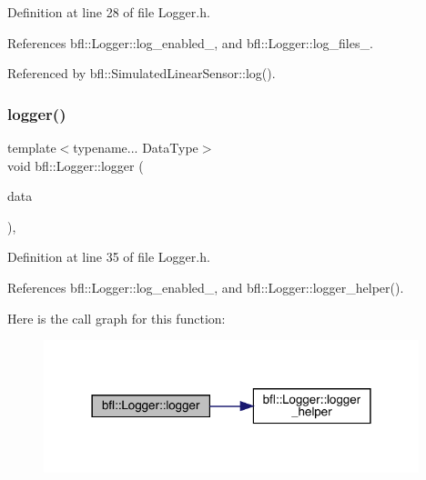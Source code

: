 Definition at line 28 of file Logger.\+h.



References bfl\+::\+Logger\+::log\+\_\+enabled\+\_\+, and bfl\+::\+Logger\+::log\+\_\+files\+\_\+.



Referenced by bfl\+::\+Simulated\+Linear\+Sensor\+::log().

\mbox{\label{classbfl_1_1Logger_aca2086c9256e5c404872b91f7f25b97d}} 
\subsubsection{\texorpdfstring{logger()}{logger()}\hspace{0.1cm}{\footnotesize\ttfamily [2/4]}}
{\footnotesize\ttfamily template$<$typename... Data\+Type$>$ \\
void bfl\+::\+Logger\+::logger (\begin{DoxyParamCaption}\item[{Data\+Type...}]{data }\end{DoxyParamCaption})\hspace{0.3cm}{\ttfamily [inline]}, {\ttfamily [inherited]}}



Definition at line 35 of file Logger.\+h.



References bfl\+::\+Logger\+::log\+\_\+enabled\+\_\+, and bfl\+::\+Logger\+::logger\+\_\+helper().

Here is the call graph for this function\+:
\nopagebreak
\begin{figure}[H]
\begin{center}
\leavevmode
\includegraphics[width=309pt]{classbfl_1_1Logger_aca2086c9256e5c404872b91f7f25b97d_cgraph}
\end{center}
\end{figure}
\mbox{\label{classbfl_1_1Logger_a50b1c109730fa98f66e66f420f0158fe}} 
